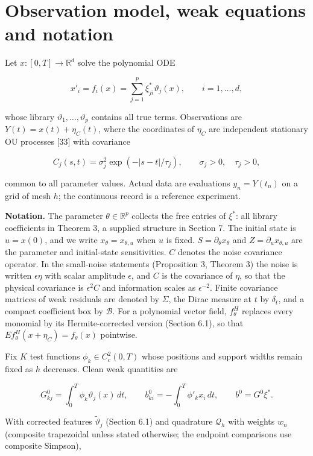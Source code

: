 \documentclass[ejs]{imsart}
\begin{document}
\section{Observation model, weak equations and
notation}\label{observation-model-weak-equations-and-notation}

Let \(x:[0,T]\to\mathbb R^d\) solve the polynomial ODE

\[
x'_i=f_i(x)=\sum_{j=1}^{p}\xi^*_{ji}\vartheta_j(x),\qquad i=1,\ldots,d,
\]

whose library \(\vartheta_1,\ldots,\vartheta_p\) contains all true
terms. Observations are \(Y(t)=x(t)+\eta_C(t)\), where the coordinates
of \(\eta_C\) are independent stationary OU processes {[}33{]} with
covariance

\[
C_j(s,t)=\sigma_j^2\exp(-|s-t|/\tau_j),\qquad \sigma_j>0,\quad\tau_j>0,
\]

common to all parameter values. Actual data are evaluations
\(y_n=Y(t_n)\) on a grid of mesh \(h\); the continuous record is a
reference experiment.

\textbf{Notation.} The parameter \(\theta\in\mathbb R^p\) collects the
free entries of \(\xi^*\): all library coefficients in Theorem 3, a
supplied structure in Section 7. The initial state is \(u=x(0)\), and we
write \(x_\theta=x_{\theta,u}\) when \(u\) is fixed.
\(S=\partial_\theta x_\theta\) and \(Z=\partial_u x_{\theta,u}\) are the
parameter and initial-state sensitivities. \(C\) denotes the noise
covariance operator. In the small-noise statements (Proposition 3,
Theorem 3) the noise is written \(\epsilon\eta\) with scalar amplitude
\(\epsilon\), and \(C\) is the covariance of \(\eta\), so that the
physical covariance is \(\epsilon^2C\) and information scales as
\(\epsilon^{-2}\). Finite covariance matrices of weak residuals are
denoted by \(\Sigma\), the Dirac measure at \(t\) by \(\delta_t\), and a
compact coefficient box by \(\mathcal B\). For a polynomial vector
field, \(f_\theta^H\) replaces every monomial by its Hermite-corrected
version (Section 6.1), so that \(E f_\theta^H(x+\eta_C)=f_\theta(x)\)
pointwise.

Fix \(K\) test functions \(\phi_k\in C_c^2(0,T)\) whose positions and
support widths remain fixed as \(h\) decreases. Clean weak quantities
are

\[
G^0_{kj}=\int_0^T\phi_k\vartheta_j(x)\,dt,\qquad
b^0_{ki}=-\int_0^T\phi'_kx_i\,dt,\qquad b^0=G^0\xi^*.
\]

With corrected features \(\widetilde\vartheta_j\) (Section 6.1) and
quadrature \(\mathcal Q_h\) with weights \(w_n\) (composite trapezoidal
unless stated otherwise; the endpoint comparisons use composite
Simpson),
\end{document}
